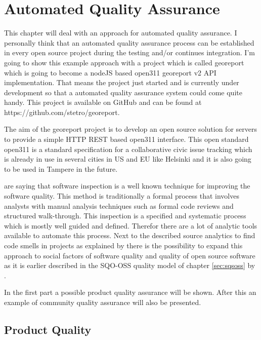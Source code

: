 \documentclass[DIV=calc,paper=a4,fontsize=9pt,twocolumn]{scrartcl}
\begin{document}
\section{Automated Quality Assurance}\label{sec:automated-quality-assurance}

This chapter will deal with an approach for automated quality assurance. I personally think that an automated quality assurance process can be established in every open source project during the testing and/or continues integration. I'm going to show this example approach with a project which is called georeport which is going to become a nodeJS based open311 georeport v2 API implementation. That means the project just started and is currently under development so that a automated quality assurance system could come quite handy. This project is available on GitHub and can be found at https://github.com/stetro/georeport.

The aim of the georeport project is to develop an open source solution for servers to provide a simple HTTP REST based open311 interface. This open standard open311 is a standard specification for a collaborative civic issue tracking which is already in use in several cities in US and EU like Helsinki and it is also going to be used in Tampere in the future. \citep{open311}

\citet{van2002java} are saying that software inspection is a well known technique for improving the software quality. This method is traditionally a formal process that involves analysts with manual analysis techniques such as formal code reviews and structured walk-through. This inspection is a specified and systematic process which is mostly well guided and defined. Therefor there are a lot of analytic tools available to automate this process. Next to the described source analytics to find code smells in projects as explained by \citet{van2002java} there is the possibility to expand this approach to social factors of software quality and quality of open source software as it is earlier described in the SQO-OSS quality model of chapter \ref{sec:sqsoss} by \citet{samoladas2008sqo}.

In the first part a possible product quality assurance will be shown. After this an example of community quality assurance will also be presented.

\subsection{Product Quality}
\end{document}
